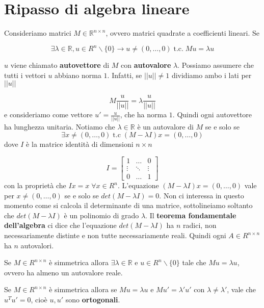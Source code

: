 \documentclass[12pt]{report}
\begin{document}
\section{Ripasso di algebra lineare}

\noindent 
Consideriamo matrici $M \in \mathbb{R}^{n \times n}$, ovvero matrici quadrate a coefficienti lineari. Se 

$$
\exists \lambda \in \mathbb{R}, u \in R^n\backslash \{0\} \rightarrow u \neq (0,\dots,0) \; \text{t.c.} \; Mu = \lambda u$$

$u$ viene chiamato \textbf{autovettore} di $M$ con \textbf{autovalore} $\lambda$. Possiamo assumere che tutti i vettori $u$ abbiano norma $1$. Infatti, se $||u|| \neq 1$ dividiamo ambo i lati per $||u||$

$$M \frac{u}{||u||} = \lambda \frac{u}{||u||}$$
e consideriamo come vettore $u' = \frac{u}{||u||}$, che ha norma $1$. Quindi ogni autovettore ha lunghezza unitaria.
Notiamo che $\lambda \in \mathbb{R}$ è un autovalore di $M$ se e solo se 
$$\exists x \neq (0,\dots,0) \; \text{t.c} \; (M - \lambda I)x = (0,\dots,0)$$
dove $I$ è la matrice identità di dimensioni $n \times n$

\[
I = \begin{bmatrix} 
     1 & \dots & 0 \\
    \vdots & \ddots & \vdots \\
    0  &  \dots   & 1 
    \end{bmatrix}
\]
con la proprietà che $I x = x \; \forall x \in R^n$. L'equazione $(M - \lambda I)x = (0,\dots,0)$ vale per $x \neq (0,\dots,0)$ se e solo se $det(M-\lambda I ) = 0$. Non ci interessa in questo momento come si calcola il determinante di una matrice, sottolineiamo soltanto che $det(M-\lambda I )$ è un polinomio di grado $\lambda$. Il \textbf{teorema fondamentale dell'algebra} ci dice che l'equazione $det(M-\lambda I )$ ha $n$ radici, non necessariamente distinte e non tutte necessariamente reali. Quindi ogni $A \in R^{n \times n}$ ha $n$ autovalori.

\begin{fatto}
    Se $M \in R^{n \times n}$ è simmetrica allora $\exists \lambda \in \mathbb{R}$ e $u \in R^{n} \backslash \{0\}$ tale che $Mu = \lambda u$, ovvero ha almeno un autovalore reale.
\end{fatto}

\begin{fatto}
    Se $M \in R^{n \times n}$ è simmetrica allora se $Mu = \lambda u$ e $Mu' = \lambda'u'$ con $\lambda \neq \lambda'$, vale che $u^Tu' = 0$, cioè $u,u'$ sono \textbf{ortogonali}.
\end{fatto}
\end{document}
